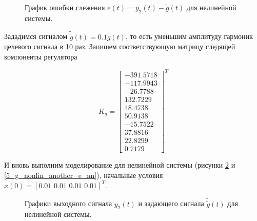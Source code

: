 \begin{figure}[!h]
	\caption{График ошибки слежения $e(t) = y_2(t)-\tilde{g}(t)$ для нелинейной системы.}
	\label{5_g_nonlin_another_e}
\end{figure}

\newpage
Зададимся сигналом $\tilde{\tilde{g}}(t) = 0.1 \tilde{g}(t)$, то есть уменьшим амплитуду гармоник целевого сигнала в 10 раз. Запишем соответствующую матрицу следящей компоненты регулятора

\begin{equation}
	K_g = \begin{bmatrix}   
		-391.5718\\ -117.9943\\  -26.7788\\  132.7229\\   48.4738 \\  50.9138\\  -15.7522 \\  37.8816\\   22.8299 \\   0.7179
	\end{bmatrix}^T
\end{equation}


И вновь выполним моделирование для нелинейной системы (рисунки \ref{5_g_nonlin_another_an} и \ref{5_g_nonlin_another_e_an}), начальные условия $x(0) = 
[0.01 \,\, 0.01 \,\, 0.01 \,\, 0.01]^T$.

\begin{figure}[!h]
	\caption{Графики выходного сигнала $y_2(t)$ и задающего сигнала $\tilde{\tilde{g}}(t)$ для нелинейной системы.}
	\label{5_g_nonlin_another_an}
\end{figure}

